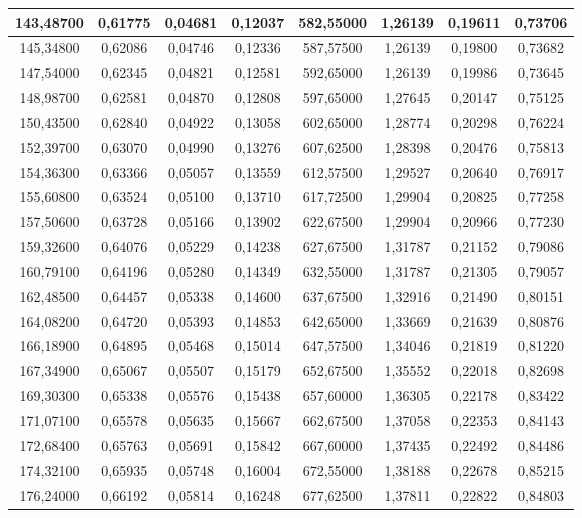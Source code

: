 \documentclass[a4paper,12pt]{article}
\numberwithin{equation}{section}
\begin{document}
\begin{appendices}
\begin{longtable}[c]{|c|c|c|c|c|c|c|c|}
143,48700	&	0,61775	&	0,04681	&	0,12037	&	582,55000	&	1,26139	&	0,19611	&	0,73706	\\\hline
145,34800	&	0,62086	&	0,04746	&	0,12336	&	587,57500	&	1,26139	&	0,19800	&	0,73682	\\\hline
147,54000	&	0,62345	&	0,04821	&	0,12581	&	592,65000	&	1,26139	&	0,19986	&	0,73645	\\\hline
148,98700	&	0,62581	&	0,04870	&	0,12808	&	597,65000	&	1,27645	&	0,20147	&	0,75125	\\\hline
150,43500	&	0,62840	&	0,04922	&	0,13058	&	602,65000	&	1,28774	&	0,20298	&	0,76224	\\\hline
152,39700	&	0,63070	&	0,04990	&	0,13276	&	607,62500	&	1,28398	&	0,20476	&	0,75813	\\\hline
154,36300	&	0,63366	&	0,05057	&	0,13559	&	612,57500	&	1,29527	&	0,20640	&	0,76917	\\\hline
155,60800	&	0,63524	&	0,05100	&	0,13710	&	617,72500	&	1,29904	&	0,20825	&	0,77258	\\\hline
157,50600	&	0,63728	&	0,05166	&	0,13902	&	622,67500	&	1,29904	&	0,20966	&	0,77230	\\\hline
159,32600	&	0,64076	&	0,05229	&	0,14238	&	627,67500	&	1,31787	&	0,21152	&	0,79086	\\\hline
160,79100	&	0,64196	&	0,05280	&	0,14349	&	632,55000	&	1,31787	&	0,21305	&	0,79057	\\\hline
162,48500	&	0,64457	&	0,05338	&	0,14600	&	637,67500	&	1,32916	&	0,21490	&	0,80151	\\\hline
164,08200	&	0,64720	&	0,05393	&	0,14853	&	642,65000	&	1,33669	&	0,21639	&	0,80876	\\\hline
166,18900	&	0,64895	&	0,05468	&	0,15014	&	647,57500	&	1,34046	&	0,21819	&	0,81220	\\\hline
167,34900	&	0,65067	&	0,05507	&	0,15179	&	652,67500	&	1,35552	&	0,22018	&	0,82698	\\\hline
169,30300	&	0,65338	&	0,05576	&	0,15438	&	657,60000	&	1,36305	&	0,22178	&	0,83422	\\\hline
171,07100	&	0,65578	&	0,05635	&	0,15667	&	662,67500	&	1,37058	&	0,22353	&	0,84143	\\\hline
172,68400	&	0,65763	&	0,05691	&	0,15842	&	667,60000	&	1,37435	&	0,22492	&	0,84486	\\\hline
174,32100	&	0,65935	&	0,05748	&	0,16004	&	672,55000	&	1,38188	&	0,22678	&	0,85215	\\\hline
176,24000	&	0,66192	&	0,05814	&	0,16248	&	677,62500	&	1,37811	&	0,22822	&	0,84803	\\\hline

\end{longtable}
\end{appendices}
\end{document}
